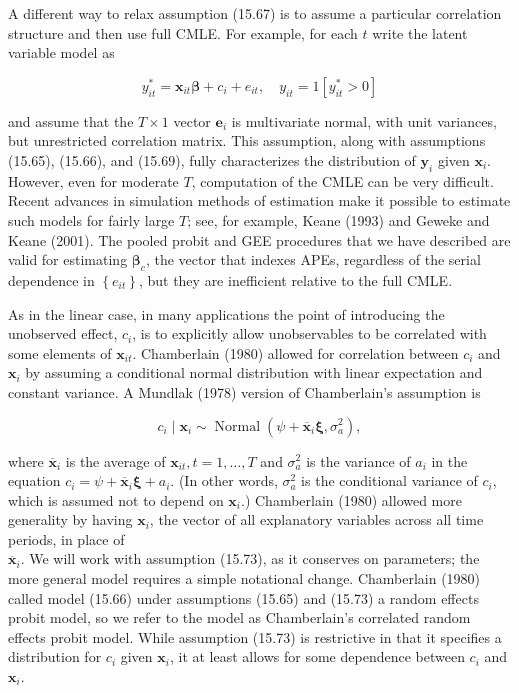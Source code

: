 \documentclass[10pt]{article}
\begin{document}
A different way to relax assumption (15.67) is to assume a particular correlation structure and then use full CMLE. For example, for each $t$ write the latent variable model as


\begin{equation*}
y_{i t}^{*}=\mathbf{x}_{i t} \boldsymbol{\beta}+c_{i}+e_{i t}, \quad y_{i t}=1\left[y_{i t}^{*}>0\right] \tag{15.72}
\end{equation*}


and assume that the $T \times 1$ vector $\mathbf{e}_{i}$ is multivariate normal, with unit variances, but unrestricted correlation matrix. This assumption, along with assumptions (15.65), (15.66), and (15.69), fully characterizes the distribution of $\mathbf{y}_{i}$ given $\mathbf{x}_{i}$. However, even for moderate $T$, computation of the CMLE can be very difficult. Recent advances in simulation methods of estimation make it possible to estimate such models for fairly large $T$; see, for example, Keane (1993) and Geweke and Keane (2001). The pooled probit and GEE procedures that we have described are valid for estimating $\boldsymbol{\beta}_{c}$, the vector that indexes APEs, regardless of the serial dependence in $\left\{e_{i t}\right\}$, but they are inefficient relative to the full CMLE.

As in the linear case, in many applications the point of introducing the unobserved effect, $c_{i}$, is to explicitly allow unobservables to be correlated with some elements of $\mathbf{x}_{i t}$. Chamberlain (1980) allowed for correlation between $c_{i}$ and $\mathbf{x}_{i}$ by assuming a conditional normal distribution with linear expectation and constant variance. A Mundlak (1978) version of Chamberlain's assumption is


\begin{equation*}
c_{i} \mid \mathbf{x}_{i} \sim \operatorname{Normal}\left(\psi+\overline{\mathbf{x}}_{i} \boldsymbol{\xi}, \sigma_{a}^{2}\right), \tag{15.73}
\end{equation*}


where $\overline{\mathbf{x}}_{i}$ is the average of $\mathbf{x}_{i t}, t=1, \ldots, T$ and $\sigma_{a}^{2}$ is the variance of $a_{i}$ in the equation $c_{i}=\psi+\overline{\mathbf{x}}_{i} \boldsymbol{\xi}+a_{i}$. (In other words, $\sigma_{a}^{2}$ is the conditional variance of $c_{i}$, which is assumed not to depend on $\mathbf{x}_{i}$.) Chamberlain (1980) allowed more generality by having $\mathbf{x}_{i}$, the vector of all explanatory variables across all time periods, in place of\\
$\overline{\mathbf{x}}_{i}$. We will work with assumption (15.73), as it conserves on parameters; the more general model requires a simple notational change. Chamberlain (1980) called model (15.66) under assumptions (15.65) and (15.73) a random effects probit model, so we refer to the model as Chamberlain's correlated random effects probit model. While assumption (15.73) is restrictive in that it specifies a distribution for $c_{i}$ given $\mathbf{x}_{i}$, it at least allows for some dependence between $c_{i}$ and $\mathbf{x}_{i}$.
\end{document}
